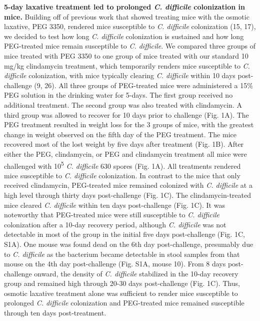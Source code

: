 \documentclass[
  11pt,
]{article}
\begin{document}
\textbf{5-day laxative treatment led to prolonged \emph{C. difficile}
colonization in mice.} Building off of previous work that showed
treating mice with the osmotic laxative, PEG 3350, rendered mice
susceptible to \emph{C. difficile} colonization (15, 17), we decided to
test how long \emph{C. difficile} colonization is sustained and how long
PEG-treated mice remain susceptible to \emph{C. difficile}. We compared
three groups of mice treated with PEG 3350 to one group of mice treated
with our standard 10 mg/kg clindamycin treatment, which temporarily
renders mice susceptible to \emph{C. difficile} colonization, with mice
typically clearing \emph{C. difficile} within 10 days post-challenge (9,
26). All three groups of PEG-treated mice were administered a 15\% PEG
solution in the drinking water for 5-days. The first group received no
additional treatment. The second group was also treated with
clindamycin. A third group was allowed to recover for 10 days prior to
challenge (Fig. 1A). The PEG treatment resulted in weight loss for the 3
groups of mice, with the greatest change in weight observed on the fifth
day of the PEG treatment. The mice recovered most of the lost weight by
five days after treatment (Fig. 1B). After either the PEG, clindamycin,
or PEG and clindamycin treatment all mice were challenged with
10\textsuperscript{5} \emph{C. difficile} 630 spores (Fig. 1A). All
treatments rendered mice susceptible to \emph{C. difficile}
colonization. In contrast to the mice that only received clindamycin,
PEG-treated mice remained colonized with \emph{C. difficile} at a high
level through thirty days post-challenge (Fig. 1C). The
clindamycin-treated mice cleared \emph{C. difficile} within ten days
post-challenge (Fig. 1C). It was noteworthy that PEG-treated mice were
still susceptible to \emph{C. difficile} colonization after a 10-day
recovery period, although \emph{C. difficile} was not detectable in most
of the group in the initial five days post-challenge (Fig. 1C, S1A). One
mouse was found dead on the 6th day post-challenge, presumably due to
\emph{C. difficile} as the bacterium became detectable in stool samples
from that mouse on the 4th day post-challenge (Fig. S1A, mouse 10). From
8 days post-challenge onward, the density of \emph{C. difficile}
stabilized in the 10-day recovery group and remained high through 20-30
days post-challenge (Fig. 1C). Thus, osmotic laxative treatment alone
was sufficient to render mice susceptible to prolonged \emph{C.
difficile} colonization and PEG-treated mice remained susceptible
through ten days post-treatment.
\end{document}
